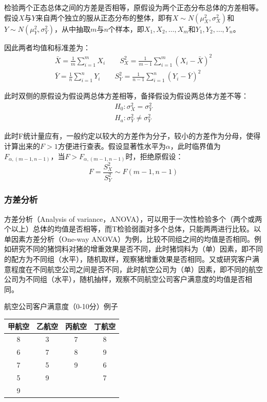 \documentclass[11pt]{article}
\begin{document}
检验两个正态总体之间的方差是否相等，原假设为两个正态分布总体的方差相等。假设$X$与$Y$来自两个独立的服从正态分布的整体，即有$X\sim N(\mu_X^2,\sigma_X^2)$和$Y\sim N(\mu_Y^2,\sigma_Y^2)$，从中抽取$m$与$n$个样本，即$X_1,X_2,\dots,X_m$和$Y_1,Y_2,\dots,Y_n$。

因此两者均值和标准差为：
\begin{gather*}
    \bar{X} = \frac{1}{m} \sum_{i=1}^{m} X_i \qquad 
    S_X^2 = \frac{1}{m-1} \sum_{i=1}^{m} \left(X_i -\bar{X}\right)^2 \\
    \bar{Y} = \frac{1}{n} \sum_{i=1}^{n} Y_i \qquad
    S_Y^2 = \frac{1}{n-1} \sum_{i=1}^{n} \left(Y_i -\bar{Y}\right)^2
\end{gather*}

此时双侧的原假设为假设两总体方差相等，备择假设为假设两总体方差不等：
\begin{align*}
    H_0: \sigma_X^2 = \sigma_Y^2 \\
    H_a: \sigma_Y^2 \neq \sigma_Y^2
\end{align*}

此时F统计量应有，一般约定以较大的方差作为分子，较小的方差作为分母，使得计算出来的$F>1$方便进行查表。假设显著性水平为$\alpha$，此时临界值为$F_{\alpha,(m-1,n-1)}$，当$F>F_{\alpha,(m-1,n-1)}$时，拒绝原假设：
\begin{equation*}
    F = \frac{S_X^2}{S_Y^2} \sim F(m-1,n-1)
\end{equation*}

\subsubsection{方差分析}

方差分析（Analysis of variance，ANOVA），可以用于一次性检验多个（两个或两个以上）总体的均值是否相等，而T检验弱面对多个总体，只能两两进行比较。以单因素方差分析（One-way ANOVA）为例，比较不同组之间的均值是否相同。例如研究不同的猪饲料对猪的增重效果是否不同，此时猪饲料为（单）因素，即不同的配方为不同组（水平），随机取样，观察猪增重效果是否相同。又或研究客户满意程度在不同航空公司之间是否不同，此时航空公司为（单）因素，即不同的航空公司为不同组（水平），随机抽样，观察不同航空公司客户满意度的均值是否相同。
\begin{example}
    航空公司客户满意度（0-10分）例子

    \begin{table}[H]
    \centering
    \begin{tabular}{@{}cccc@{}}
    \toprule
    \textbf{甲航空} & \textbf{乙航空} & \textbf{丙航空} & \textbf{丁航空} \\ \midrule
    8 & 3 & 7 & 8 \\
    6 & 7 & 8 & 9 \\
    7 & 5 & 9 & 6 \\
    5 & 9 &   & 7 \\
    9 &   &   &   \\ \bottomrule
    \end{tabular}
    \end{table}
\end{example}
\end{document}

